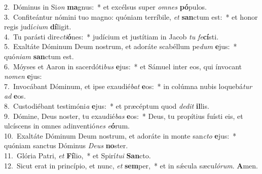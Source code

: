 {2.~}Dóminus in Si\textit{on} \textbf{ma}gnus:~* et excélsus super \textit{om}\textit{nes} \textbf{pó}pulos.\\
{3.~}Confiteántur nómini tuo magno: quóniam terríbile, \textit{et} \textbf{san}ctum est:~* et honor regis judí\textit{ci}\textit{um} \textbf{dí}ligit.\\
{4.~}Tu parásti dire\textit{cti}\textbf{ó}nes:~* judícium et justítiam in Jacob \textit{tu} \textit{fe}\textbf{cí}sti.\\
{5.~}Exaltáte Dóminum Deum nostrum, et adoráte scabéllum pe\textit{dum} \textbf{e}jus:~* quó\textit{ni}\textit{am} \textbf{san}ctum est.\\
{6.~}Móyses et Aaron in sacerdóti\textit{bus} \textbf{e}jus:~* et Sámuel inter eos, qui ínvocant \textit{no}\textit{men} \textbf{e}jus:\\
{7.~}Invocábant Dóminum, et ipse exaudié\textit{bat} \textbf{e}os:~* in colúmna nubis loquebá\textit{tur} \textit{ad} \textbf{e}os.\\
{8.~}Custodiébant testimóni\textit{a} \textbf{e}jus:~* et præcéptum quod \textit{de}\textit{dit} \textbf{il}lis.\\
{9.~}Dómine, Deus noster, tu exaudié\textit{bas} \textbf{e}os:~* Deus, tu propítius fuísti eis, et ulcíscens in omnes adinventió\textit{nes} \textit{e}\textbf{ó}rum.\\
{10.~}Exaltáte Dóminum Deum nostrum, et adoráte in monte san\textit{cto} \textbf{e}jus:~* quóniam sanctus Dóminus \textit{De}\textit{us} \textbf{no}ster.\\
{11.~}Glória Patri, \textit{et} \textbf{Fí}lio,~* et Spirí\textit{tu}\textit{i} \textbf{San}cto.\\
{12.~}Sicut erat in princípio, et nunc, \textit{et} \textbf{sem}per,~* et in sǽcula sæcu\textit{ló}\textit{rum}. \textbf{A}men.\\
